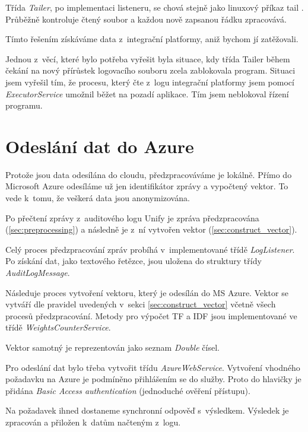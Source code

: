 \documentclass[thesis=M,czech]{FITthesis}[2012/10/20]
\begin{document}
		Třída \textit{Tailer}, po implementaci listeneru, se chová stejně jako linuxový příkaz tail \cite{tailLinux}. Průběžně kontroluje čtený soubor a každou nově zapsanou řádku zpracovává.
		
		Tímto řešením získáváme data z~integrační platformy, aniž bychom jí zatěžovali. 
		
		 Jednou z~věcí, které bylo potřeba vyřešit byla situace, kdy třída Tailer během čekání na nový přírůstek logovacího souboru zcela zablokovala program. Situaci jsem vyřešil tím, že procesu, který čte z~logu integrační platformy jsem pomocí \textit{ExecutorService} \cite{javaExecutorService} umožnil běžet na pozadí aplikace. Tím jsem neblokoval řízení programu.
	\section{Odeslání dat do Azure}
		\label{sec:send_to_azure}
		
		Protože jsou data odesílána do cloudu, předzpracováváme je lokálně. Přímo do Microsoft Azure odesíláme už jen identifikátor zprávy a vypočtený vektor. To vede k~tomu, že veškerá data jsou anonymizována.
		
		Po přečtení zprávy z~auditového logu Unify je zpráva předzpracována (\ref{sec:preprocessing}) a následně je z~ní vytvořen vektor (\ref{sec:construct_vector}).
		 
		Celý proces předzpracování zpráv probíhá v~implementované třídě \textit{LogListener}. Po získání dat, jako textového řetězce, jsou uložena do struktury třídy \textit{AuditLogMessage}. 
		
		Následuje proces vytvoření vektoru, který je odesílán do MS Azure. Vektor se vytváří dle pravidel uvedených v~sekci \ref{sec:construct_vector} včetně všech procesů předzpracování. Metody pro výpočet TF a IDF jsou implementované ve třídě \textit{WeightsCounterService}.  
		
		Vektor samotný je reprezentován jako seznam \textit{Double} čísel.
		
		Pro odeslání dat bylo třeba vytvořit třídu \textit{AzureWebService}. Vytvoření vhodného požadavku na Azure je podmíněno přihlášením se do služby. Proto do hlavičky je přidána \textit{Basic Access authentication} (jednoduché ověření přístupu).
		
		Na požadavek ihned dostaneme synchronní odpověď s~výsledkem. Výsledek je zpracován a přiložen k~datům načteným z~logu.
		
\end{document}

